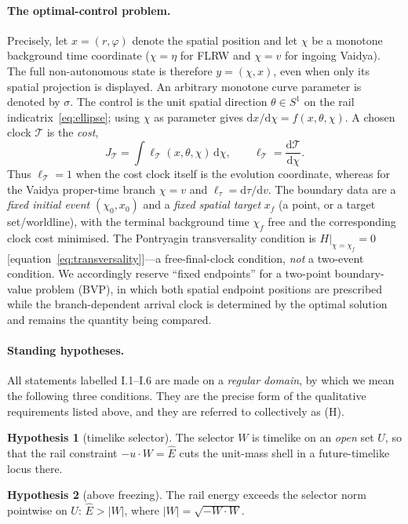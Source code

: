 \documentclass[12pt]{iopart}
\newcommand{\Ehat}{\hat E}
\newcommand{\dd}{\mathrm{d}}
\theoremstyle{plain}
\theoremstyle{definition}
\newtheorem{hypothesis}{Hypothesis}
\theoremstyle{plain}
\theoremstyle{remark}
\begin{document}
\paragraph{The optimal-control problem.} Precisely, let $x=(r,\varphi)$ denote the
spatial position and let $\chi$ be a monotone background time coordinate ($\chi=\eta$
for FLRW and $\chi=v$ for ingoing Vaidya). The full non-autonomous state is therefore
$y=(\chi,x)$, even when only its spatial projection is displayed. An arbitrary monotone
curve parameter is denoted by $\sigma$. The control is the unit spatial direction
$\theta\in S^1$ on the rail indicatrix~\eqref{eq:ellipse}; using $\chi$ as parameter gives
$\dd x/\dd\chi=f(x,\theta,\chi)$. A chosen clock $\mathcal T$ is the \emph{cost},
\[
    J_{\mathcal T}=\int \ell_{\mathcal T}(x,\theta,\chi)\,\dd\chi,
    \qquad \ell_{\mathcal T}=\frac{\dd\mathcal T}{\dd\chi}.
\]
Thus $\ell_{\mathcal T}=1$ when the cost clock itself is the evolution coordinate,
whereas for the Vaidya proper-time branch $\chi=v$ and
$\ell_\tau=\dd\tau/\dd v$. The boundary data are a \emph{fixed initial event}
$(\chi_0,x_0)$ and a \emph{fixed spatial target} $x_f$ (a point, or a target
set/worldline), with the terminal background time $\chi_f$ free and the corresponding
clock cost minimised. The Pontryagin transversality condition is
$H|_{\chi=\chi_f}=0$ [equation~\eqref{eq:transversality}]---a free-final-clock condition,
\emph{not} a two-event condition. We accordingly reserve ``fixed endpoints'' for a
two-point boundary-value problem (BVP), in which both spatial endpoint positions are
prescribed while the branch-dependent arrival clock is determined by the optimal
solution and remains the quantity being compared.

\paragraph{Standing hypotheses.} All statements labelled I.1--I.6 are made on a
\emph{regular domain}, by which we mean the following three conditions. They are the
precise form of the qualitative requirements listed above, and they are referred to
collectively as (H).

\begin{hypothesis}[timelike selector]\label{hyp:selector}
The selector $W$ is timelike on an \emph{open} set $U$, so that the
rail constraint $-u\cdot W=\Ehat$ cuts the unit-mass shell in a future-timelike locus
there.
\end{hypothesis}

\begin{hypothesis}[above freezing]\label{hyp:convex}
The rail energy exceeds the selector norm pointwise on $U$:
$\Ehat>|W|$, where $|W|=\sqrt{-W\cdot W}$.
\end{hypothesis}
\end{document}
